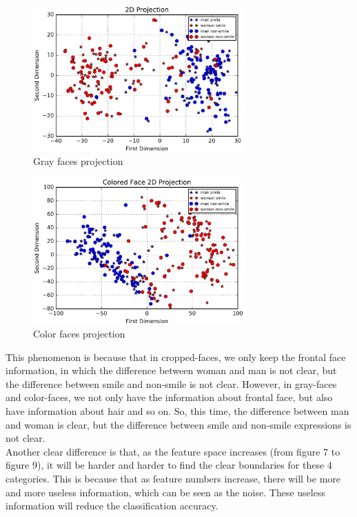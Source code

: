 \documentclass[11pt,letterpaper]{article}
\begin{document}
\begin{figure}[H]
\centering
\includegraphics[width=81mm]{front_2dProjection.png}
\caption{Gray faces projection}
\label{front.lable}
\end{figure}

\begin{figure}[H]
\centering
\includegraphics[width=81mm]{color_2dProjection.png}
\caption{Color faces projection}
\label{Fig_color.lable}
\end{figure}

This phenomenon is because that in cropped-faces, we only keep the frontal face information, in which the difference between woman and man is not clear, but the difference between smile and non-smile is not clear. However, in gray-faces and color-faces, we not only have the information about frontal face, but also have information about hair and so on. So, this time, the difference between man and woman is clear, but the difference between smile and non-smile expressions is not clear.\\

Another clear difference is that, as the feature space increases (from figure 7 to figure 9), it will be harder and harder to find the clear boundaries for these 4 categories. This is because that as feature numbers increase, there will be more and more useless information, which can be seen as the noise. These useless information will reduce the classification accuracy. \\
\end{document}
